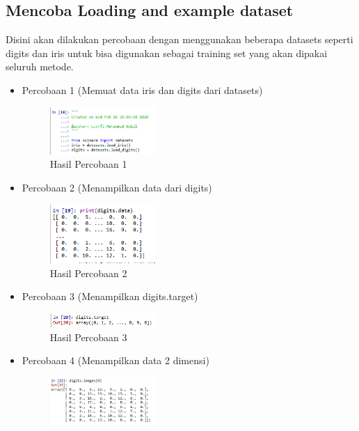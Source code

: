 \subsection{Mencoba Loading and example dataset}
Disini akan dilakukan percobaan dengan menggunakan beberapa datasets seperti digits dan iris untuk bisa digunakan sebagai training set yang akan dipakai seluruh metode.
\begin{itemize}
	\item Percobaan 1 (Memuat data iris dan digits dari datasets) \hfill \break 
	\begin{figure}[H]
		\includegraphics[width=4cm]{figures/1174035/chapter1/2_1_hasil.png}
		\centering
		\caption{Hasil Percobaan 1}
	\end{figure}
	\item Percobaan 2 (Menampilkan data dari digits) \hfill \break 
	\begin{figure}[H]
		\includegraphics[width=4cm]{figures/1174035/chapter1/2_2_hasil.png}
		\centering
		\caption{Hasil Percobaan 2}
	\end{figure}
	\item Percobaan 3 (Menampilkan digits.target) \hfill \break 
	\begin{figure}[H]
		\includegraphics[width=4cm]{figures/1174035/chapter1/2_3_hasil.png}
		\centering
		\caption{Hasil Percobaan 3}
	\end{figure}
	\item Percobaan 4 (Menampilkan data 2 dimensi) \hfill \break 
	\begin{figure}[H]
		\includegraphics[width=4cm]{figures/1174035/chapter1/2_4_hasil.png}

\end{figure}
\end{itemize}
